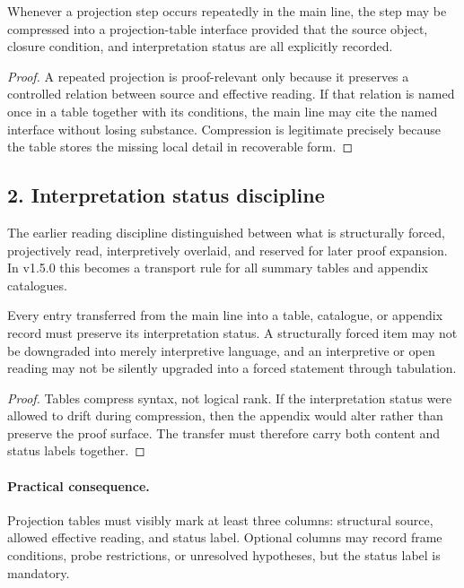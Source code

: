 \begin{lemma}
\label{lem:projection-interface-lemma}
Whenever a projection step occurs repeatedly in the main line, the step may be
compressed into a projection-table interface provided that the source object,
closure condition, and interpretation status are all explicitly recorded.
\end{lemma}

\begin{proof}
A repeated projection is proof-relevant only because it preserves a controlled
relation between source and effective reading. If that relation is named once in
a table together with its conditions, the main line may cite the named interface
without losing substance. Compression is legitimate precisely because the table
stores the missing local detail in recoverable form.
\end{proof}

\subsection*{2. Interpretation status discipline}
The earlier reading discipline distinguished between what is structurally
forced, projectively read, interpretively overlaid, and reserved for later proof expansion. In
v1.5.0 this becomes a transport rule for all summary tables and appendix
catalogues.

\begin{proposition}
\label{prop:interpretation-status-transport}
Every entry transferred from the main line into a table, catalogue, or appendix
record must preserve its interpretation status. A structurally forced item may
not be downgraded into merely interpretive language, and an interpretive or open reading may not
be silently upgraded into a forced statement through tabulation.
\end{proposition}

\begin{proof}
Tables compress syntax, not logical rank. If the interpretation status were
allowed to drift during compression, then the appendix would alter rather than
preserve the proof surface. The transfer must therefore carry both content and
status labels together.
\end{proof}

\paragraph{Practical consequence.}
Projection tables must visibly mark at least three columns: structural source,
allowed effective reading, and status label. Optional columns may record frame
conditions, probe restrictions, or unresolved hypotheses, but the status label
is mandatory.


